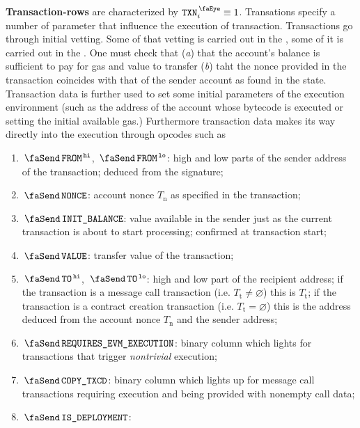 \textbf{Transaction-rows} are characterized by $\peekTransaction_{i} \equiv 1$.
Transations specify a number of parameter that influence the execution of transaction.
Transactions go through initial vetting.
Some of that vetting is carried out in the \hubMod{}, some of it is carried out in the \userTxnDataMod{}.
One must check that
(\emph{a}) that the account's balance is sufficient to pay for gas and value to transfer
(\emph{b}) taht the nonce provided in the transaction coincides with that of the sender account as found in the state.
Transaction data is further used to set some initial parameters of the execution environment (such as the address of the account whose bytecode is executed or setting the initial available gas.)
Furthermore transaction data makes its way directly into the execution through opcodes such as \inst{}
\begin{enumerate}
	\item
		\godGiven{}
		$\txFrom\high$, $\txFrom\low$:
		high and low parts of the sender address of the transaction; deduced from the signature;
	\item
		\godGiven{}
		$\txNonce$:
		account nonce $T_\text{n}$ as specified in the transaction;
	\item
		\godGiven{}
		\markAsJustifiedHere{}
		$\txInitialBalance$:
		value available in the sender just as the current transaction is about to start processing; confirmed at transaction start;
	\item
		\godGiven{}
		$\txValue$:
		transfer value of the transaction;
	\item
		\godGiven{}
		$\txTo\high$, $\txTo\low$:
		high and low part of the recipient address;
		if the transaction is a message call transaction (i.e. $T_{\text{t}} \neq \varnothing$) this is $T_{\text{t}}$;
		if the transaction is a contract creation transaction (i.e. $T_{\text{t}} = \varnothing$) this is the address deduced from the account nonce $T_\text{n}$ and the sender address;
	\item
		\godGiven{}
		\markAsPartiallyJustifiedHere{}
		$\txRequiresEvmExecution$:
		binary column which lights for transactions that trigger \emph{nontrivial} \evm{} execution;
	\item
		\godGiven{}
		$\txCopyTxcd$:
		binary column which lights up for message call transactions requiring \evm{} execution and being provided with nonempty call data;
	\item
		\godGiven{}
		$\txIsDeployment$:

\end{enumerate}
